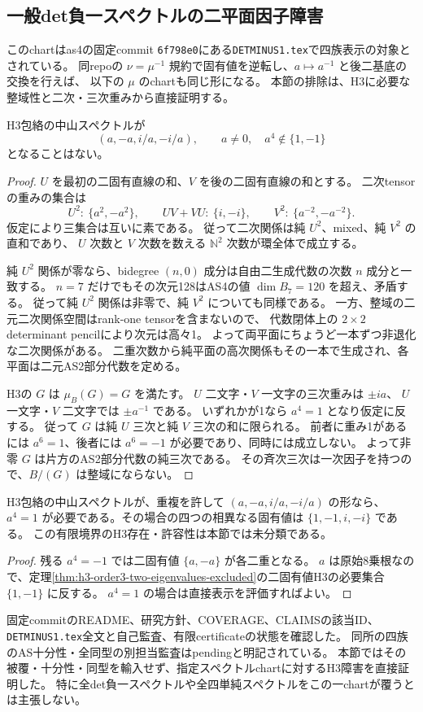 \subsection{一般det負一スペクトルの二平面因子障害}
\label{subsec:cubic-detminus1-spectral}
このchartはas4の固定commit
\texttt{6f798e0}にある\texttt{DETMINUS1.tex}で四族表示の対象とされている\cite{AS4detChart}。
同repoの $\nu=\mu^{-1}$ 規約で固有値を逆転し、$a\mapsto a^{-1}$ と後二基底の交換を行えば、
以下の $\mu$ のchartも同じ形になる。
本節の排除は、H3に必要な整域性と二次・三次重みから直接証明する。

\begin{theorem}[一般det負一chartのH3排除]
\label{thm:cubic-detminus1-spectral-empty}
H3包絡の中山スペクトルが
\[
 (a,-a,i/a,-i/a),\qquad a\ne0,\quad a^4\notin\{1,-1\}
\]
となることはない。
\end{theorem}
\begin{proof}
$U$ を最初の二固有直線の和、$V$ を後の二固有直線の和とする。
二次tensorの重みの集合は
\[
 U^2:\ \{a^2,-a^2\},\qquad
 UV+VU:\ \{i,-i\},\qquad
 V^2:\ \{a^{-2},-a^{-2}\}.
\]
仮定により三集合は互いに素である。
従って二次関係は純 $U^2$、mixed、純 $V^2$ の直和であり、
$U$ 次数と $V$ 次数を数える $\mathbb N^2$ 次数が環全体で成立する。

純 $U^2$ 関係が零なら、bidegree $(n,0)$ 成分は自由二生成代数の次数 $n$ 成分と一致する。
$n=7$ だけでもその次元128はAS4の値 $\dim B_7=120$ を超え、矛盾する。
従って純 $U^2$ 関係は非零で、純 $V^2$ についても同様である。
一方、整域の二元二次関係空間はrank-one tensorを含まないので、
代数閉体上の $2\times2$ determinant pencilにより次元は高々1。
よって両平面にちょうど一本ずつ非退化な二次関係がある。
二重次数から純平面の高次関係もその一本で生成され、各平面は二元AS2部分代数を定める。

H3の $G$ は $\mu_B(G)=G$ を満たす。
$U$ 二文字・$V$ 一文字の三次重みは $\pm ia$、
$U$ 一文字・$V$ 二文字では $\pm a^{-1}$ である。
いずれかが1なら $a^4=1$ となり仮定に反する。
従って $G$ は純 $U$ 三次と純 $V$ 三次の和に限られる。
前者に重み1があるには $a^6=1$、後者には $a^6=-1$ が必要であり、同時には成立しない。
よって非零 $G$ は片方のAS2部分代数の純三次である。
その斉次三次は一次因子を持つので、$B/(G)$ は整域にならない。
\end{proof}

\begin{corollary}[同じスペクトル式の境界]
\label{cor:cubic-detminus1-spectral-boundary}
H3包絡の中山スペクトルが、重複を許して $(a,-a,i/a,-i/a)$ の形なら、
$a^4=1$ が必要である。その場合の四つの相異なる固有値は $\{1,-1,i,-i\}$ である。
この有限境界のH3存在・許容性は本節では未分類である。
\end{corollary}
\begin{proof}
残る $a^4=-1$ では二固有値 $\{a,-a\}$ が各二重となる。
$a$ は原始8乗根なので、定理\ref{thm:h3-order3-two-eigenvalues-excluded}の二固有値H3の必要集合 $\{1,-1\}$ に反する。
$a^4=1$ の場合は直接表示を評価すればよい。
\end{proof}

\begin{remark}[as4参照の範囲]
固定commitのREADME、研究方針、COVERAGE、CLAIMSの該当ID、
\texttt{DETMINUS1.tex}全文と自己監査、有限certificateの状態を確認した。
同所の四族のAS十分性・全同型の別担当監査はpendingと明記されている。
本節ではその被覆・十分性・同型を輸入せず、指定スペクトルchartに対するH3障害を直接証明した。
特に全det負一スペクトルや全四単純スペクトルをこの一chartが覆うとは主張しない。
\end{remark}
